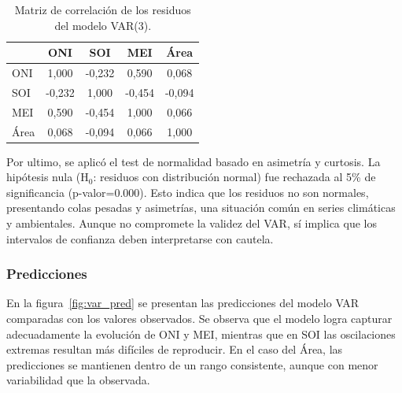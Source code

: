 \begin{table}[H]
    \centering
    \caption{Matriz de correlación de los residuos del modelo VAR(3).}
    \label{tab:var_corr_resid}
    \begin{tabular}{lcccc}
        \toprule
               & ONI & SOI & MEI & Área \\
        \midrule
        ONI     & 1,000 & -0,232 &  0,590 &  0,068 \\
        SOI     & -0,232 & 1,000 & -0,454 & -0,094 \\
        MEI     & 0,590 & -0,454 &  1,000 &  0,066 \\
        Área    & 0,068 & -0,094 &  0,066 &  1,000 \\
        \bottomrule
    \end{tabular}
\end{table}

Por ultimo, se aplicó el test de normalidad basado en asimetría y curtosis. La hipótesis nula (H$_0$: residuos con distribución normal) fue rechazada al 5\% de significancia (p-valor=0.000). Esto indica que los residuos no son normales, presentando colas pesadas y asimetrías, una situación común en series climáticas y ambientales. Aunque no compromete la validez del VAR, sí implica que los intervalos de confianza deben interpretarse con cautela.

\subsubsection{Predicciones}
En la figura~\ref{fig:var_pred} se presentan las predicciones del modelo VAR comparadas con los valores observados. Se observa que el modelo logra capturar adecuadamente la evolución de ONI y MEI, mientras que en SOI las oscilaciones extremas resultan más difíciles de reproducir. En el caso del Área, las predicciones se mantienen dentro de un rango consistente, aunque con menor variabilidad que la observada.

